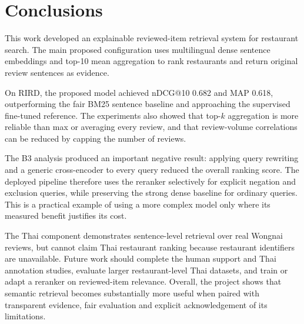 \chapter{Conclusions}

This work developed an explainable reviewed-item retrieval system for restaurant search. The
main proposed configuration uses multilingual dense sentence embeddings and top-10 mean
aggregation to rank restaurants and return original review sentences as evidence.

On RIRD, the proposed model achieved nDCG@10 0.682 and MAP 0.618, outperforming the fair BM25
sentence baseline and approaching the supervised fine-tuned reference. The experiments also
showed that top-$k$ aggregation is more reliable than max or averaging every review, and that
review-volume correlations can be reduced by capping the number of reviews.

The B3 analysis produced an important negative result: applying query rewriting and a generic
cross-encoder to every query reduced the overall ranking score. The deployed pipeline therefore
uses the reranker selectively for explicit negation and exclusion queries, while preserving the
strong dense baseline for ordinary queries. This is a practical example of using a more
complex model only where its measured benefit justifies its cost.

The Thai component demonstrates sentence-level retrieval over real Wongnai reviews, but cannot
claim Thai restaurant ranking because restaurant identifiers are unavailable. Future work
should complete the human support and Thai annotation studies, evaluate larger restaurant-level
Thai datasets, and train or adapt a reranker on reviewed-item relevance. Overall, the project
shows that semantic retrieval becomes substantially more useful when paired with transparent
evidence, fair evaluation and explicit acknowledgement of its limitations.
